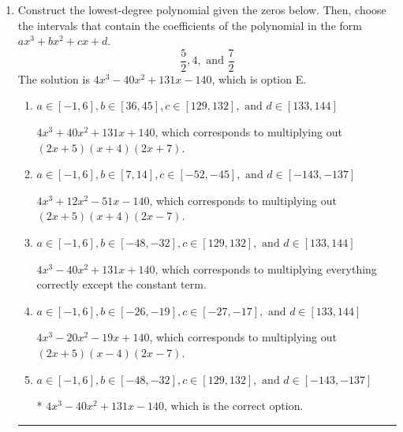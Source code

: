 \documentclass{extbook}[14pt]
\newcommand{\litem}[1]{\item #1

\rule{\textwidth}{0.4pt}}
\begin{document}
\begin{enumerate}\litem{
Construct the lowest-degree polynomial given the zeros below. Then, choose the intervals that contain the coefficients of the polynomial in the form $ax^3+bx^2+cx+d$.
\[ \frac{5}{2}, 4, \text{ and } \frac{7}{2} \]The solution is \( 4x^{3} -40 x^{2} +131 x -140 \), which is option E.\begin{enumerate}[label=\Alph*.]
\item \( a \in [-1, 6], b \in [36, 45], c \in [129, 132], \text{ and } d \in [133, 144] \)

$4x^{3} +40 x^{2} +131 x + 140$, which corresponds to multiplying out $(2x + 5)(x + 4)(2x + 7)$.
\item \( a \in [-1, 6], b \in [7, 14], c \in [-52, -45], \text{ and } d \in [-143, -137] \)

$4x^{3} +12 x^{2} -51 x -140$, which corresponds to multiplying out $(2x + 5)(x + 4)(2x -7)$.
\item \( a \in [-1, 6], b \in [-48, -32], c \in [129, 132], \text{ and } d \in [133, 144] \)

$4x^{3} -40 x^{2} +131 x + 140$, which corresponds to multiplying everything correctly except the constant term.
\item \( a \in [-1, 6], b \in [-26, -19], c \in [-27, -17], \text{ and } d \in [133, 144] \)

$4x^{3} -20 x^{2} -19 x + 140$, which corresponds to multiplying out $(2x + 5)(x -4)(2x -7)$.
\item \( a \in [-1, 6], b \in [-48, -32], c \in [129, 132], \text{ and } d \in [-143, -137] \)

* $4x^{3} -40 x^{2} +131 x -140$, which is the correct option.
\end{enumerate}

}
\end{enumerate}
\end{document}
